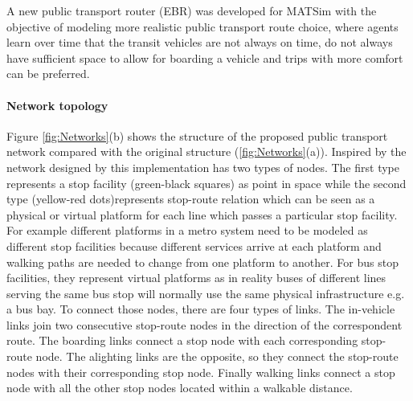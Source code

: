 A new public transport router (EBR) was developed for MATSim with the objective of modeling more realistic public transport route choice, where agents learn over time that the transit vehicles are not always on time, do not always have sufficient space to allow for boarding a vehicle and trips with more comfort can be preferred.

\paragraph{Network topology}

Figure \ref{fig:Networks}(b) shows the structure of the proposed public transport network compared with the original structure (\ref{fig:Networks}(a)). Inspired by the network designed by \citet{SpiessFlorian_TransResB_1989} this implementation has two types of nodes. The first type represents a stop facility (green-black squares) as point in space while the second type (yellow-red dots)represents stop-route relation which can be seen as a physical or virtual platform for each line which passes a particular stop facility. For example different platforms in a metro system need to be modeled as different stop facilities because different services arrive at each platform and walking paths are needed to change from one platform to another. For bus stop facilities, they represent virtual platforms as in reality buses of different lines serving the same bus stop will normally use the same physical infrastructure e.g. a bus bay. To connect those nodes, there are four types of links. The in-vehicle links join two consecutive stop-route nodes in the direction of the correspondent route. The boarding links connect a stop node with each corresponding stop-route node. The alighting links are the opposite, so they connect the stop-route nodes with their corresponding stop node. Finally walking links connect a stop node with all the other stop nodes located within a walkable distance.

